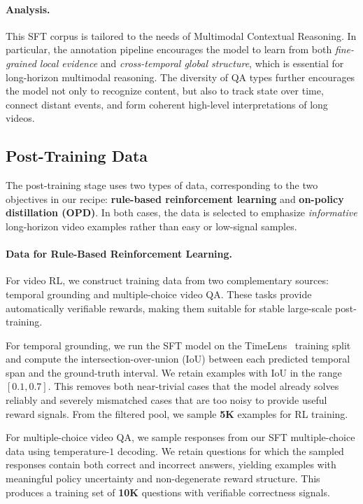 \documentclass[11pt, letterpaper]{template}
\theoremstyle{plain}
\theoremstyle{definition}
\theoremstyle{remark}
\begin{document}
\paragraph{Analysis.}
This SFT corpus is tailored to the needs of Multimodal Contextual Reasoning. In particular, the annotation pipeline encourages the model to learn from both \emph{fine-grained local evidence} and \emph{cross-temporal global structure}, which is essential for long-horizon multimodal reasoning. The diversity of QA types further encourages the model not only to recognize content, but also to track state over time, connect distant events, and form coherent high-level interpretations of long videos.

\subsection{Post-Training Data}

The post-training stage uses two types of data, corresponding to the two objectives in our recipe: \textbf{rule-based reinforcement learning} and \textbf{on-policy distillation (OPD)}. In both cases, the data is selected to emphasize \emph{informative} long-horizon video examples rather than easy or low-signal samples.

\paragraph{Data for Rule-Based Reinforcement Learning.}
For video RL, we construct training data from two complementary sources: temporal grounding and multiple-choice video QA. These tasks provide automatically verifiable rewards, making them suitable for stable large-scale post-training.

For temporal grounding, we run the SFT model on the TimeLens~\citep{zhang2026timelens} training split and compute the intersection-over-union (IoU) between each predicted temporal span and the ground-truth interval. We retain examples with IoU in the range $[0.1, 0.7]$. This removes both near-trivial cases that the model already solves reliably and severely mismatched cases that are too noisy to provide useful reward signals. From the filtered pool, we sample \textbf{5K} examples for RL training.

For multiple-choice video QA, we sample responses from our SFT multiple-choice data using temperature-$1$ decoding. We retain questions for which the sampled responses contain both correct and incorrect answers, yielding examples with meaningful policy uncertainty and non-degenerate reward structure. This produces a training set of \textbf{10K} questions with verifiable correctness signals.
\end{document}
